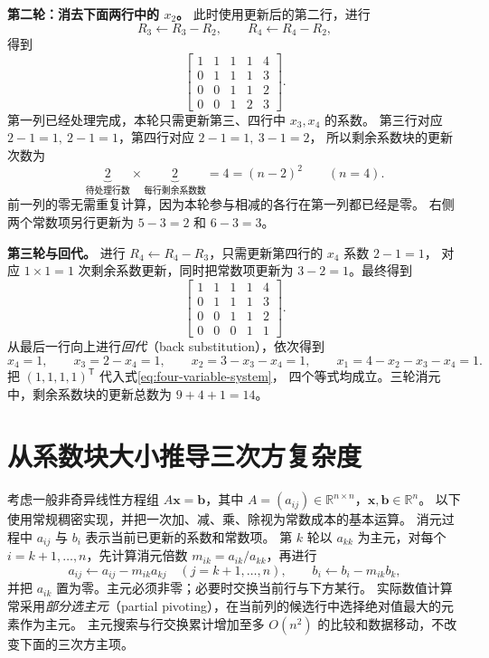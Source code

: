 \documentclass[UTF8,12pt,a4paper,fontset=fandol]{ctexart}
\begin{document}
\begin{solve}
\textbf{第二轮：消去下面两行中的 $x_2$。}
此时使用更新后的第二行，进行
\[
  R_3\leftarrow R_3-R_2,\qquad R_4\leftarrow R_4-R_2,
\]
得到
\begin{equation}
  \left[
  \begin{array}{cccc|c}
    1&1&1&1&4\\
    0&1&1&1&3\\
    0&0&\boxed{1}&\boxed{1}&2\\
    0&0&\boxed{1}&\boxed{2}&3
  \end{array}
  \right].
  \label{eq:elimination-second-round}
\end{equation}
第一列已经处理完成，本轮只需更新第三、四行中 $x_3,x_4$ 的系数。
第三行对应 $2-1=1,\ 2-1=1$，第四行对应 $2-1=1,\ 3-1=2$，
所以剩余系数块的更新次数为
\[
  \underbrace{2}_{\text{待处理行数}}
  \times\underbrace{2}_{\text{每行剩余系数数}}
  =4=(n-2)^2\qquad(n=4).
\]
前一列的零无需重复计算，因为本轮参与相减的各行在第一列都已经是零。
右侧两个常数项另行更新为 $5-3=2$ 和 $6-3=3$。

\textbf{第三轮与回代。}
进行 $R_4\leftarrow R_4-R_3$，只需更新第四行的 $x_4$ 系数 $2-1=1$，
对应 $1\times1=1$ 次剩余系数更新，同时把常数项更新为 $3-2=1$。最终得到
\begin{equation}
  \left[
  \begin{array}{cccc|c}
    1&1&1&1&4\\
    0&1&1&1&3\\
    0&0&1&1&2\\
    0&0&0&\boxed{1}&1
  \end{array}
  \right].
  \label{eq:elimination-upper-triangular}
\end{equation}
从最后一行向上进行\emph{回代}（back substitution），依次得到
\[
  x_4=1,\qquad
  x_3=2-x_4=1,\qquad
  x_2=3-x_3-x_4=1,\qquad
  x_1=4-x_2-x_3-x_4=1.
\]
把 $(1,1,1,1)^{\mathsf T}$ 代入式\eqref{eq:four-variable-system}，
四个等式均成立。三轮消元中，剩余系数块的更新总数为 $9+4+1=14$。
\end{solve}

\section{从系数块大小推导三次方复杂度}

考虑一般非奇异线性方程组 $A\boldsymbol x=\boldsymbol b$，其中
$A=(a_{ij})\in\mathbb R^{n\times n}$，$\boldsymbol x,\boldsymbol b\in\mathbb R^n$。
以下使用常规稠密实现，并把一次加、减、乘、除视为常数成本的基本运算。
消元过程中 $a_{ij}$ 与 $b_i$ 表示当前已更新的系数和常数项。
第 $k$ 轮以 $a_{kk}$ 为主元，对每个 $i=k+1,\ldots,n$，先计算消元倍数
$m_{ik}=a_{ik}/a_{kk}$，再进行
\begin{equation}
  a_{ij}\leftarrow a_{ij}-m_{ik}a_{kj}\quad(j=k+1,\ldots,n),
  \qquad b_i\leftarrow b_i-m_{ik}b_k,
  \label{eq:general-elimination-update}
\end{equation}
并把 $a_{ik}$ 置为零。主元必须非零；必要时交换当前行与下方某行。
实际数值计算常采用\emph{部分选主元}（partial pivoting），在当前列的候选行中选择绝对值最大的元素作为主元。
主元搜索与行交换累计增加至多 $O(n^2)$ 的比较和数据移动，不改变下面的三次方主项。
\end{document}
